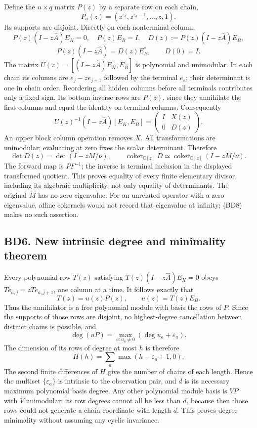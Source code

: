 \documentclass[11pt]{article}
\begin{document}
Define the \(n\times q\) matrix \(P(z)\) by a separate row on each chain, \[
P_a(z)=(z^{\varepsilon_a},z^{\varepsilon_a-1},\ldots,z,1).
\] Its supports are disjoint. Directly on each nonterminal column, \[
P(z)(I-z\widehat A)E_K=0,\quad P(z)E_B=I,\quad
D(z):=P(z)(I-z\widehat A)E_B,
\] \[
P(z)(I-z\widehat A)=D(z)E_B^*,\qquad D(0)=I. \tag{BD7}
\] The matrix \(U(z)=[(I-z\widehat A)E_K,E_B]\) is polynomial and unimodular. In each chain its columns are \(e_j-ze_{j+1}\) followed by the terminal \(e_\varepsilon\); their determinant is one in chain order. Reordering all hidden columns before all terminals contributes only a fixed sign. Its bottom inverse rows are \(P(z)\), since they annihilate the first columns and equal the identity on terminal columns. Consequently \[
U(z)^{-1}(I-z\widehat A)[E_K,E_B]
=\begin{pmatrix}I&X(z)\\0&D(z)\end{pmatrix}.
\] An upper block column operation removes \(X\). All transformations are unimodular; evaluating at zero fixes the scalar determinant. Therefore \[
\det D(z)=\det(I-zM/\nu),\qquad
\operatorname{coker}_{\mathbb C[z]}D\simeq
\operatorname{coker}_{\mathbb C[z]}(I-zM/\nu). \tag{BD8}
\] The forward map is \(PF^{-1}\); the inverse is terminal inclusion in the displayed transformed quotient. This proves equality of every finite elementary divisor, including its algebraic multiplicity, not only equality of determinants. The original \(M\) has no zero eigenvalue. For an unrelated operator with a zero eigenvalue, affine cokernels would not record that eigenvalue at infinity; (BD8) makes no such assertion.

\subsection{BD6. New intrinsic degree and minimality theorem}\label{bd6.-new-intrinsic-degree-and-minimality-theorem}

Every polynomial row \(T(z)\) satisfying \(T(z)(I-z\widehat A)E_K=0\) obeys \(Te_{a,j}=zTe_{a,j+1}\), one column at a time. It follows exactly that \[
T(z)=u(z)P(z),\qquad u(z)=T(z)E_B. \tag{BD9}
\] Thus the annihilator is a free polynomial module with basis the rows of \(P\). Since the supports of those rows are disjoint, no highest-degree cancellation between distinct chains is possible, and \[
\deg(uP)=\max_{a:u_a\ne0}(\deg u_a+\varepsilon_a).
\] The dimension of its rows of degree at most \(h\) is therefore \[
H(h)=\sum_a\max(h-\varepsilon_a+1,0). \tag{BD10}
\] The second finite differences of \(H\) give the number of chains of each length. Hence the multiset \(\{\varepsilon_a\}\) is intrinsic to the observation pair, and \(d\) is its necessary maximum polynomial basis degree. Any other polynomial module basis is \(VP\) with \(V\) unimodular; its row degrees cannot all be less than \(d\), because then those rows could not generate a chain coordinate with length \(d\). This proves degree minimality without assuming any cyclic invariance.
\end{document}

